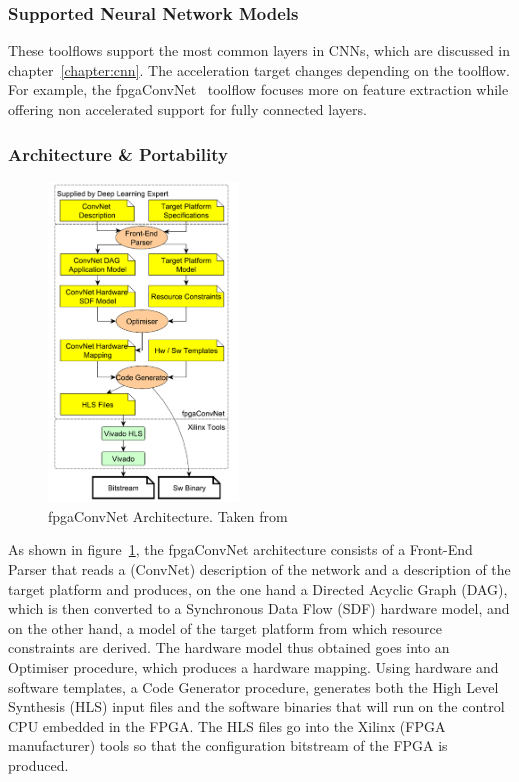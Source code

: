 \subsubsection{Supported Neural Network Models}

These toolflows support the most common layers in CNNs, which are discussed in
chapter~\ref{chapter:cnn}. The acceleration target changes depending on the
toolflow.  For example, the fpgaConvNet~\cite{fpgaconvnet} toolflow focuses more
on feature extraction while offering non accelerated support for fully connected
layers.

\subsubsection{Architecture \& Portability}

\begin{figure}[!htbp]
    \centering
    \includegraphics[width=0.45\textwidth]{Figures/fpgaconvnet.png}
    \caption{fpgaConvNet Architecture. Taken from~\cite{fpgaconvnet}}
    \label{figure:fpgaconvnet}
\end{figure}

As shown in figure~\ref{figure:fpgaconvnet}, the fpgaConvNet architecture
consists of a Front-End Parser that reads a (ConvNet) description of the network
and a description of the target platform and produces, on the one hand a
Directed Acyclic Graph (DAG), which is then converted to a Synchronous Data Flow
(SDF) hardware model, and on the other hand, a model of the target platform from
which resource constraints are derived. The hardware model thus obtained goes
into an Optimiser procedure, which produces a hardware mapping. Using hardware
and software templates, a Code Generator procedure, generates both the High
Level Synthesis (HLS) input files and the software binaries that will run on the
control CPU embedded in the FPGA. The HLS files go into the Xilinx (FPGA
manufacturer) tools so that the configuration bitstream of the FPGA is produced.

